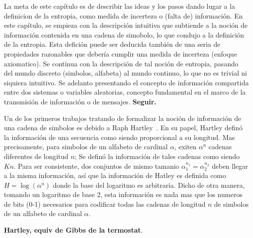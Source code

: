 {\color{red} La  meta de este cap\'itulo es  de describir las ideas  y los pasos
  dando lugar a la definicion de  la entropia, como medida de incerteza o (falta
  de)  informaci\'on.   En este  cap\'itulo,  se  empieza  con la  descripci\'on
  intuitiva que subtiende a la noci\'on de informaci\'on contenida en una cadena
  de simobolo, lo que condujo a  la definici\'on de la entropia. Esta defici\'on
  puede  ser deducida  tambi\'en  de  una seria  de  propiedades razonables  que
  deber\'ia cumplir  una medida de incerteza (enfoque  axiomatico).  Se continua
  con la descripci\'on  de tal noci\'on de entropia,  pasando del mundo discreto
  (simbolos,  alfabeta) al  mundo continuo,  lo que  no es  trivial  ni siquiera
  intuitivo.  Se  adelanto presentando  el concepto de  informaci\'on compartida
  entre dos sistemas o variables aleatorias, concepto fundamental en el marco de
  la transmisi\'on de informaci\'on o de mensajes. \bf Seguir. }


\label{s:SZ:Entropia}


\label{sec:SZ:DefinicionShannon}

Un de los primeros trabajos  tratando de formalizar la noci\'on de informaci\'on
de una cadena  de simbolos es debido a Raph  Hartley~\cite{Har28}.  En su papel,
Hartley defin\'o la informaci\'on de una secuencia como siendo proporcional a su
longitud. Mas precisamente,  para simbolos de un alfabeto  de cardinal $\alpha$,
exiten  $\alpha^n$   cadenas  diferentes  de   longitud  $n$;  Se   defin\'o  la
informaci\'on de  tales cadenas  como siendo $K  n$.  Para ser  consistente, dos
conjuntos de mismo  tamanio $\alpha_1^{n_1} = \alpha_2^{n_2}$ deben  llegar a la
misma informaci\'on, as\'i que la informaci\'on  de Hatley es definida como $H =
\log\left( \alpha^n \right)$  donde la base del logaritmo  es arbitraria.  Dicho
de otra manera,  tomando un logaritmo de base 2, esta  informaci\'on es nada mas
que los  numeros de bits  (0-1) necesarios para  codificar todas las  cadenas de
longitud $n$ de simbolos de un alfabeto de cardinal $\alpha$.

{\color{red}\bf Hartley, equiv de Gibbs de la termostat}.

